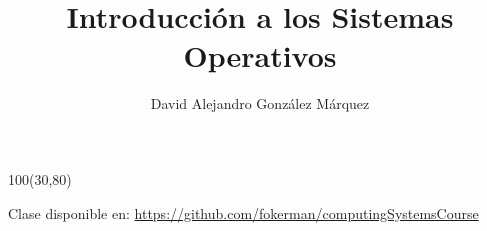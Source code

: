 \documentclass[aspectratio=169]{beamer}
\title{\Huge Introducción a los Sistemas Operativos}
\author{David Alejandro González Márquez}
\date{}
\begin{document}
\begin{frame}[plain]
    \titlepage
    \begin{textblock}{100}(30,80)
    \begin{tcolorbox}[size=small,width=\textwidth,colback={gray!30},title={}]
    \begin{center}
     \scriptsize Clase disponible en: \url{https://github.com/fokerman/computingSystemsCourse}
    \end{center}
    \end{tcolorbox}
    \end{textblock}
\end{frame}
\end{document}
